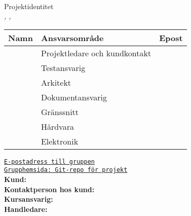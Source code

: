 \documentclass[kravspec/krav.tex]{subfiles}
\newenvironment{projektidentitet}{%
{\ }\vspace{30mm}
\renewcommand{\arraystretch}{2}
\begin{center}
  {\huge Projektidentitet\\[1ex]}
  \textsl{\VARgruppnummer, \LIPSdatum, \VARprojekttitel}\\[1cm]
    \begin{tabular}{lp{60mm}l}
      \hline
      \textbf{Namn} &
      \textbf{Ansvarsområde} &
      \textbf{Epost} \\
	\hline
      }%
      {%
      \hline
    \end{tabular}
\end{center}
}
\newcommand{\gruppmedlem}[3]{{#1} & {#2} & {#3} \\}
\begin{document}
\thispagestyle{empty}

\begin{projektidentitet}
\gruppmedlem{\VARprojektledare}{Projektledare och kundkontakt}
    {\href{mailto:\VARprojektledaremail}
    {\texttt{\VARprojektledaremail}}}
\gruppmedlem{\VARkundansvarig}{Testansvarig}
    {\href{mailto:\VARkundansvarigmail}
    {\texttt{\VARkundansvarigmail}}}
\gruppmedlem{\VARarkitekt}{Arkitekt}
    {\href{mailto:\VARarkitektmail}
    {\texttt{\VARarkitektmail}}}
\gruppmedlem{\VARdokumentansvarig}{Dokumentansvarig}
    {\href{mailto:\VARdokumentansvarigmail}
    {\texttt{\VARdokumentansvarigmail}}}
\gruppmedlem{\VARgranssnitt}{Gränssnitt}
    {\href{mailto:\VARgranssnittmail}
    {\texttt{\VARgranssnittmail}}}
\gruppmedlem{\VARhardware}{Hårdvara}
    {\href{mailto:\VARhardwaremail}
    {\texttt{\VARhardwaremail}}}
\gruppmedlem{\VARelektronik}{Elektronik}
    {\href{mailto:\VARelektronikmail}
    {\texttt{\VARelektronikmail}}}
\end{projektidentitet}

\begin{center}
\vspace{0.5cm}
{\href{mailto:\VARdokumentansvarigmail,\VARarkitektmail,\VARprojektledaremail,
    \VARgranssnittmail,\VARprojektledaremail,\VARhardwaremail,
    \VARelektronikmail,\VARkundansvarigmail}{
\texttt{E-postadress till gruppen}}}\\

{\href{\VARgrupphemsida}{
\texttt{Grupphemsida: Git-repo för projekt}}}\\[1cm]

{\textbf{Kund:} \VARbestallare}\\[0.5ex]
{\textbf{Kontaktperson hos kund:} \VARkontaktperson}\\[1cm]

{\textbf{Kursansvarig:} \VARkursansvarig}\\[1ex]
{\textbf{Handledare:} \VARhandledare}

\end{center}
\newpage
\end{document}
